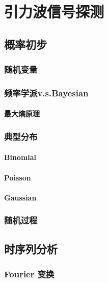 
\chapter{引力波信号探测}
\label{chap6}


\section{概率初步}
\subsection{随机变量}
\subsection{频率学派v.s.Bayesian}
\subsubsection{最大熵原理}
\subsection{典型分布}
\subsubsection{Binomial}
\subsubsection{Poisson}
\subsubsection{Gaussian}
\subsection{随机过程}

\section{时序列分析}
\subsection{Fourier 变换}
